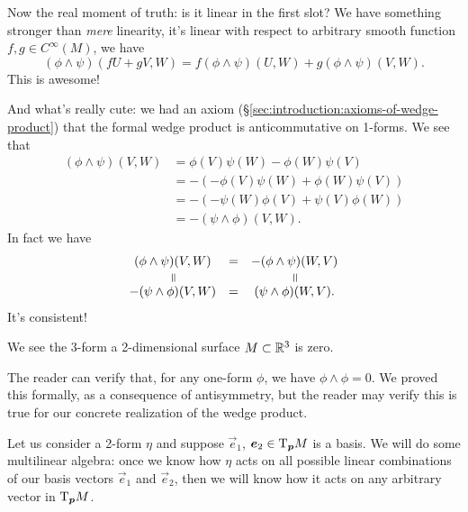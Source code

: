 Now the real moment of truth: is it linear in the
first slot? We have something stronger than \emph{mere} linearity, it's
linear with respect to arbitrary smooth function $f,g\in C^{\infty}(M)$,
we have
\begin{equation}
(\phi\wedge\psi)(fU + gV,W) = f(\phi\wedge\psi)(U,W) + g(\phi\wedge\psi)(V,W).
\end{equation}
This is awesome!

And what's really cute: we had an axiom
(\S\ref{sec:introduction:axioms-of-wedge-product}) that the formal wedge
product is anticommutative on 1-forms. We see that
\begin{subequations}
  \begin{align}
    (\phi\wedge\psi)(V,W)
    &=\phi(V)\psi(W) -\phi(W)\psi(V)\\
    &=-(-\phi(V)\psi(W)+\phi(W)\psi(V))\\
    &=-(-\psi(W)\phi(V)+\psi(V)\phi(W))\\
    &=-(\psi\wedge\phi)(V,W).
  \end{align}
\end{subequations}
In fact we have
\begin{equation}
\begin{array}{ccc}
(\phi\wedge\psi)(V,W) &=& -(\phi\wedge\psi)(W,V)\\
\rotatebox[origin=c]{-90}{$=$} & & \rotatebox[origin=c]{-90}{$=$}\\
-(\psi\wedge\phi)(V,W) &=& (\psi\wedge\phi)(W,V).
\end{array}
\end{equation}
It's consistent!

\begin{remark}
We see the 3-form a 2-dimensional surface $M\subset\mathbb{R}^{3}$ is zero.
\end{remark}

The reader can verify that, for any one-form $\phi$, we have
$\phi\wedge\phi=0$. We proved this formally, as a consequence of
antisymmetry, but the reader may verify this is true for our concrete
realization of the wedge product.

\M
Let us consider a 2-form $\eta$ and suppose $\vec{e}_{1}$,
$\boldsymbol{e}_{2}\in\mathrm{T}_{\boldsymbol{p}}M$ is a basis. We will do some multilinear
algebra: once we know how $\eta$ acts on all possible linear
combinations of our basis vectors $\vec{e}_{1}$ and $\vec{e}_{2}$,
then we will know how it acts on any arbitrary vector in $\mathrm{T}_{\boldsymbol{p}}M$.

